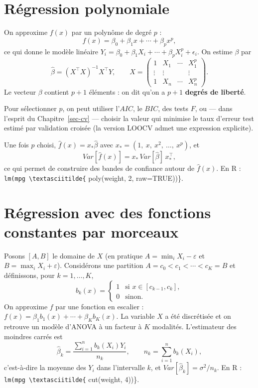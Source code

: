 \documentclass[
  french,
  letterpaper,
  DIV=11,
  numbers=noendperiod]{scrreprt}
\begin{document}
\section{Régression polynomiale}\label{ruxe9gression-polynomiale}

On approxime \(f(x)\) par un polynôme de degré \(p\) :
\[f(x) = \beta_0 + \beta_1 x + \cdots + \beta_p x^p,\] ce qui donne le
modèle linéaire
\(Y_i = \beta_0 + \beta_1 X_i + \cdots + \beta_p X_i^p + \epsilon_i\).
On estime \(\beta\) par \[\hat\beta = (X^\top X)^{-1}X^\top Y, \qquad
X = \begin{pmatrix} 1 & X_1 & \cdots & X_1^p\\ \vdots & \vdots & & \vdots\\ 1 & X_n & \cdots & X_n^p \end{pmatrix}.\]
Le vecteur \(\beta\) contient \(p+1\) éléments : on dit qu'on a \(p+1\)
\textbf{degrés de liberté}.

Pour sélectionner \(p\), on peut utiliser l'\(AIC\), le \(BIC\), des
tests \(F\), ou --- dans l'esprit du Chapitre~\ref{sec-cv} --- choisir
la valeur qui minimise le taux d'erreur test estimé par validation
croisée (la version LOOCV admet une expression explicite).

Une fois \(p\) choisi, \(\hat f(x) = x_*\hat\beta\) avec
\(x_* = (1,\ x,\ x^2,\ \ldots,\ x^p)\), et
\[Var[\hat f(x)] = x_*\, Var[\hat\beta]\, x_*^\top,\] ce qui permet de
construire des bandes de confiance autour de \(\hat f(x)\). En R :
\texttt{lm(mpg\ \textbackslash{}textasciitilde\{} poly(weight, 2,
raw=TRUE))\}.

\section{Régression avec des fonctions constantes par
morceaux}\label{ruxe9gression-avec-des-fonctions-constantes-par-morceaux}

Posons \([A,B]\) le domaine de \(X\) (en pratique
\(A = \min_i X_i - \varepsilon\) et \(B = \max_i X_i + \varepsilon\)).
Considérons une partition \(A = c_0 < c_1 < \cdots < c_K = B\) et
définissons, pour \(k = 1,\ldots,K\),
\[b_k(x) = \begin{cases} 1 & \mbox{si } x\in[c_{k-1},c_k],\\ 0 & \mbox{sinon}.\end{cases}\]
On approxime \(f\) par une fonction en escalier :
\(f(x) = \beta_1 b_1(x) + \cdots + \beta_K b_K(x)\). La variable \(X\) a
été discrétisée et on retrouve un modèle d'ANOVA à un facteur à \(K\)
modalités. L'estimateur des moindres carrés est
\[\hat\beta_k = \frac{\sum_{i=1}^n b_k(X_i)Y_i}{n_k}, \qquad n_k = \sum_{i=1}^n b_k(X_i),\]
c'est-à-dire la moyenne des \(Y_i\) dans l'intervalle \(k\), et
\(Var[\hat\beta_k] = \sigma^2/n_k\). En R :
\texttt{lm(mpg\ \textbackslash{}textasciitilde\{} cut(weight, 4))\}.
\end{document}
